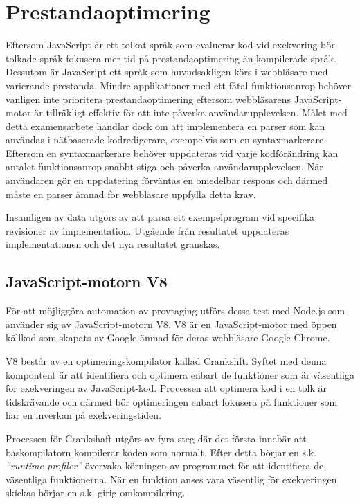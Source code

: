 \section{Prestandaoptimering}

Eftersom JavaScript är ett tolkat språk som evaluerar kod vid exekvering bör
tolkade språk fokusera mer tid på prestandaoptimering än kompilerade språk. Dessutom är
JavaScript ett språk som huvudsakligen körs i webbläsare med varierande
prestanda. Mindre applikationer med ett fåtal funktionsanrop behöver vanligen
inte prioritera prestandaoptimering eftersom webbläsarens JavaScript-motor är
tillräkligt effektiv för att inte påverka användarupplevelsen. Målet med detta
examensarbete handlar dock om att implementera en parser som kan användas i
nätbaserade kodredigerare, exempelvis som en syntaxmarkerare. Eftersom en
syntaxmarkerare behöver uppdateras vid varje kodförändring kan antalet
funktionsanrop snabbt stiga och påverka användarupplevelsen. När användaren
gör en uppdatering förväntas en omedelbar respons och därmed måste en parser
ämnad för webbläsare uppfylla detta krav.

Insamligen av data utgörs av att parsa ett exempelprogram vid specifika
revisioner av implementation. Utgående från resultatet uppdateras
implementationen och det nya resultatet granskas.

\subsection{JavaScript-motorn V8}

För att möjliggöra automation av provtaging utförs dessa test med Node.js
som använder sig av JavaScript-motorn V8. V8 är en JavaScript-motor med öppen
källkod som skapats av Google ämnad för deras webbläsare Google Chrome.

V8 består av en optimeringskompilator kallad Crankshft. Syftet med denna
kompontent är att identifiera och optimera enbart de funktioner som är
väsentliga för exekveringen av JavaScript-kod. Processen att optimera kod i en
tolk är tidskrävande och därmed bör optimeringen enbart fokusera på funktioner
som har en inverkan på exekveringstiden.

Processen för Crankshaft utgörs av fyra steg där det första innebär att
baskompilatorn kompilerar koden som normalt. Efter detta börjar en s.k.
\textit{``runtime-profiler''} övervaka körningen av programmet för att
identifiera de väsentliga funktionerna. När en funktion anses vara väsentlig
för exekveringen skickas börjar en s.k. girig omkompilering.

